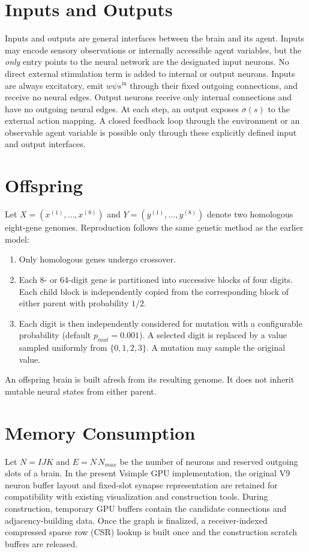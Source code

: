 \documentclass[12pt,a4paper]{article}
\begin{document}
\section{Inputs and Outputs}
Inputs and outputs are general interfaces between the brain and its agent. Inputs may encode sensory observations or internally accessible agent variables, but the \emph{only} entry points to the neural network are the designated input neurons. No direct external stimulation term is added to internal or output neurons. Inputs are always excitatory, emit $w\psi s^{\mathrm{in}}$ through their fixed outgoing connections, and receive no neural edges. Output neurons receive only internal connections and have no outgoing neural edges. At each step, an output exposes $\sigma(s)$ to the external action mapping. A closed feedback loop through the environment or an observable agent variable is possible only through these explicitly defined input and output interfaces.

\section{Offspring}
Let $X=(x^{(1)},\ldots,x^{(8)})$ and $Y=(y^{(1)},\ldots,y^{(8)})$ denote two homologous eight-gene genomes. Reproduction follows the same genetic method as the earlier model:
\begin{enumerate}
\item Only homologous genes undergo crossover.
\item Each 8- or 64-digit gene is partitioned into successive blocks of four digits. Each child block is independently copied from the corresponding block of either parent with probability $1/2$.
\item Each digit is then independently considered for mutation with a configurable probability (default $p_{mut}=0.001$). A selected digit is replaced by a value sampled uniformly from $\{0,1,2,3\}$. A mutation may sample the original value.
\end{enumerate}
An offspring brain is built afresh from its resulting genome. It does not inherit mutable neural states from either parent.

\section{Memory Consumption}
Let $N=IJK$ and $E=N\,N_{max}$ be the number of neurons and reserved outgoing slots of a brain. In the present Vsimple GPU implementation, the original V9 neuron buffer layout and fixed-slot synapse representation are retained for compatibility with existing visualization and construction tools. During construction, temporary GPU buffers contain the candidate connections and adjacency-building data. Once the graph is finalized, a receiver-indexed compressed sparse row (CSR) lookup is built once and the construction scratch buffers are released.
\end{document}
